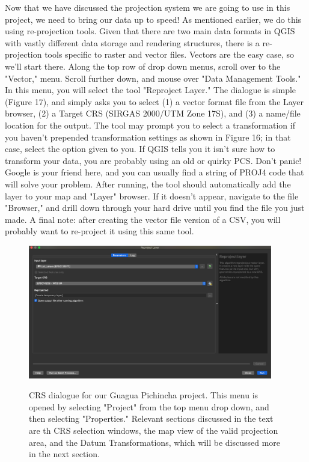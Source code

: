 \documentclass{article}
\begin{document}
Now that we have discussed the projection system we are going to use in this project, we need to bring our data up to speed! As mentioned earlier, we do this using re-projection tools. Given that there are two main data formats in QGIS with vastly different data storage and rendering structures, there is a re-projection tools specific to raster and vector files. Vectors are the easy case, so we'll start there. Along the top row of drop down menus, scroll over to the "Vector," menu. Scroll further down, and mouse over "Data Management Tools." In this menu, you will select the tool "Reproject Layer." The dialogue is simple (Figure 17), and simply asks you to select (1) a vector format file from the Layer browser, (2) a Target CRS (SIRGAS 2000/UTM Zone 17S), and (3) a name/file location for the output. The tool may prompt you to select a transformation if you haven't prepended transformation settings as shown in Figure 16; in that case, select the option given to you. If QGIS tells you it isn't sure how to transform your data, you are probably using an old or quirky PCS. Don't panic! Google is your friend here, and you can usually find a string of PROJ4 code that will solve your problem. After running, the tool should automatically add the layer to your map and "Layer" browser. If it doesn't appear, navigate to the file "Browser," and drill down through your hard drive until you find the file you just made. A final note: after creating the vector file version of a CSV, you will probably want to re-project it using this same tool. 

\begin{figure}[htbp]
    \centering
    \includegraphics[width=0.95\textwidth]{Fig_18_reproj_vector.png}
    \label{fig13}
    \caption{CRS dialogue for our Guagua Pichincha project. This menu is opened by selecting "Project" from the top menu drop down, and then selecting "Properties." Relevant sections discussed in the text are th CRS selection windows, the map view of the valid projection area, and the Datum Transformations, which will be discussed more in the next section.}
\end{figure}
\end{document}
